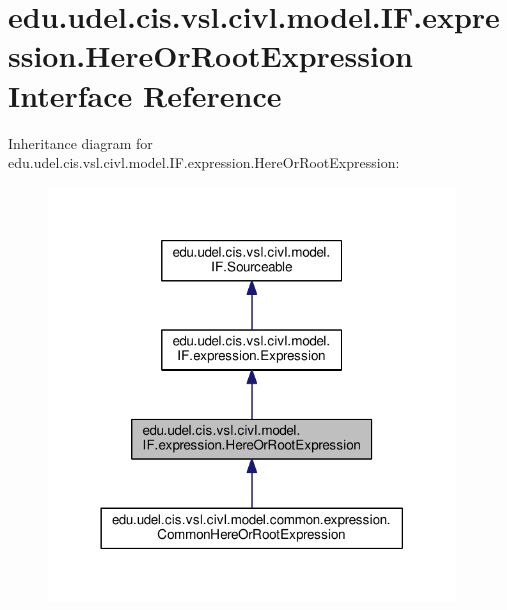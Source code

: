 \hypertarget{interfaceedu_1_1udel_1_1cis_1_1vsl_1_1civl_1_1model_1_1IF_1_1expression_1_1HereOrRootExpression}{}\section{edu.\+udel.\+cis.\+vsl.\+civl.\+model.\+I\+F.\+expression.\+Here\+Or\+Root\+Expression Interface Reference}
\label{interfaceedu_1_1udel_1_1cis_1_1vsl_1_1civl_1_1model_1_1IF_1_1expression_1_1HereOrRootExpression}


Inheritance diagram for edu.\+udel.\+cis.\+vsl.\+civl.\+model.\+I\+F.\+expression.\+Here\+Or\+Root\+Expression\+:
\nopagebreak
\begin{figure}[H]
\begin{center}
\leavevmode
\includegraphics[width=306pt]{interfaceedu_1_1udel_1_1cis_1_1vsl_1_1civl_1_1model_1_1IF_1_1expression_1_1HereOrRootExpression__inherit__graph}
\end{center}
\end{figure}


